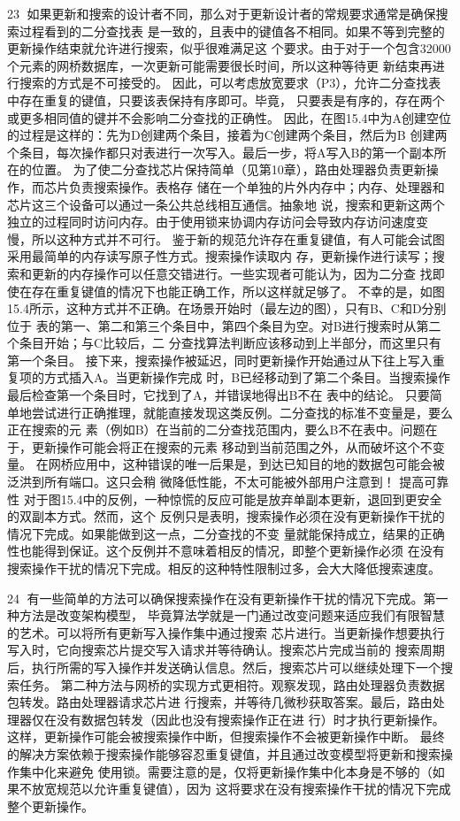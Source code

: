                                                 23
如果更新和搜索的设计者不同，那么对于更新设计者的常规要求通常是确保搜索过程看到的二分查找表
是一致的，且表中的键值各不相同。如果不等到完整的更新操作结束就允许进行搜索，似乎很难满足这
个要求。由于对于一个包含32000个元素的网桥数据库，一次更新可能需要很长时间，所以这种等待更
新结束再进行搜索的方式是不可接受的。
因此，可以考虑放宽要求（P3），允许二分查找表中存在重复的键值，只要该表保持有序即可。毕竟，
只要表是有序的，存在两个或更多相同值的键并不会影响二分查找的正确性。
因此，在图15.4中为A创建空位的过程是这样的：先为D创建两个条目，接着为C创建两个条目，然后为B
创建两个条目，每次操作都只对表进行一次写入。最后一步，将A写入B的第一个副本所在的位置。
为了使二分查找芯片保持简单（见第10章），路由处理器负责更新操作，而芯片负责搜索操作。表格存
储在一个单独的片外内存中；内存、处理器和芯片这三个设备可以通过一条公共总线相互通信。抽象地
说，搜索和更新这两个独立的过程同时访问内存。由于使用锁来协调内存访问会导致内存访问速度变
慢，所以这种方式并不可行。
鉴于新的规范允许存在重复键值，有人可能会试图采用最简单的内存读写原子性方式。搜索操作读取内
存，更新操作进行读写；搜索和更新的内存操作可以任意交错进行。一些实现者可能认为，因为二分查
找即使在存在重复键值的情况下也能正确工作，所以这样就足够了。
不幸的是，如图15.4所示，这种方式并不正确。在场景开始时（最左边的图），只有B、C和D分别位于
表的第一、第二和第三个条目中，第四个条目为空。对B进行搜索时从第二个条目开始；与C比较后，二
分查找算法判断应该移动到上半部分，而这里只有第一个条目。
接下来，搜索操作被延迟，同时更新操作开始通过从下往上写入重复项的方式插入A。当更新操作完成
时，B已经移动到了第二个条目。当搜索操作最后检查第一个条目时，它找到了A，并错误地得出B不在
表中的结论。
只要简单地尝试进行正确推理，就能直接发现这类反例。二分查找的标准不变量是，要么正在搜索的元
素（例如B）在当前的二分查找范围内，要么B不在表中。问题在于，更新操作可能会将正在搜索的元素
移动到当前范围之外，从而破坏这个不变量。
在网桥应用中，这种错误的唯一后果是，到达已知目的地的数据包可能会被泛洪到所有端口。这只会稍
微降低性能，不太可能被外部用户注意到！
提高可靠性
对于图15.4中的反例，一种惊慌的反应可能是放弃单副本更新，退回到更安全的双副本方式。然而，这个
反例只是表明，搜索操作必须在没有更新操作干扰的情况下完成。如果能做到这一点，二分查找的不变
量就能保持成立，结果的正确性也能得到保证。这个反例并不意味着相反的情况，即整个更新操作必须
在没有搜索操作干扰的情况下完成。相反的这种特性限制过多，会大大降低搜索速度。


                                                24
有一些简单的方法可以确保搜索操作在没有更新操作干扰的情况下完成。第一种方法是改变架构模型，
毕竟算法学就是一门通过改变问题来适应我们有限智慧的艺术。可以将所有更新写入操作集中通过搜索
芯片进行。当更新操作想要执行写入时，它向搜索芯片提交写入请求并等待确认。搜索芯片完成当前的
搜索周期后，执行所需的写入操作并发送确认信息。然后，搜索芯片可以继续处理下一个搜索任务。
第二种方法与网桥的实现方式更相符。观察发现，路由处理器负责数据包转发。路由处理器请求芯片进
行搜索，并等待几微秒获取答案。最后，路由处理器仅在没有数据包转发（因此也没有搜索操作正在进
行）时才执行更新操作。这样，更新操作可能会被搜索操作中断，但搜索操作不会被更新操作中断。
最终的解决方案依赖于搜索操作能够容忍重复键值，并且通过改变模型将更新和搜索操作集中化来避免
使用锁。需要注意的是，仅将更新操作集中化本身是不够的（如果不放宽规范以允许重复键值），因为
这将要求在没有搜索操作干扰的情况下完成整个更新操作。

